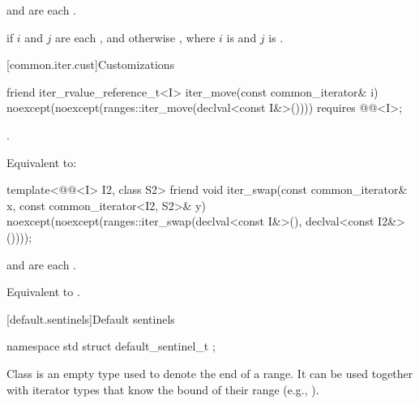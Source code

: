 \begin{itemdescr}
\pnum
\expects
{} and 
are each .

\pnum
\returns
{} if $i$ and $j$ are each , and otherwise
, where
$i$ is  and $j$ is .
\end{itemdescr}

[common.iter.cust]{Customizations}

%
\begin{itemdecl}
friend iter_rvalue_reference_t<I> iter_move(const common_iterator& i)
  noexcept(noexcept(ranges::iter_move(declval<const I&>())))
    requires @@<I>;
\end{itemdecl}

\begin{itemdescr}
\pnum
\expects
{}.

\pnum
\effects
Equivalent to: 
\end{itemdescr}

%
\begin{itemdecl}
template<@@<I> I2, class S2>
  friend void iter_swap(const common_iterator& x, const common_iterator<I2, S2>& y)
    noexcept(noexcept(ranges::iter_swap(declval<const I&>(), declval<const I2&>())));
\end{itemdecl}

\begin{itemdescr}
\pnum
\expects
{} and 
are each .

\pnum
\effects
Equivalent to .
\end{itemdescr}

[default.sentinels]{Default sentinels}

%
\begin{itemdecl}
namespace std {
  struct default_sentinel_t { };
}
\end{itemdecl}

\pnum
Class  is an empty type used to denote the end of a
range. It can be used together with iterator types that know the bound
of their range (e.g., ).

